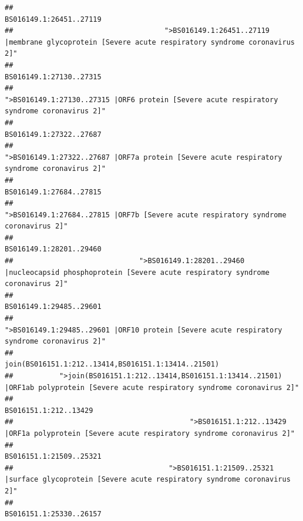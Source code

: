 \documentclass[
]{article}
\begin{document}
\begin{verbatim}
##                                                                                                                BS016149.1:26451..27119 
##                                    ">BS016149.1:26451..27119 |membrane glycoprotein [Severe acute respiratory syndrome coronavirus 2]" 
##                                                                                                                BS016149.1:27130..27315 
##                                             ">BS016149.1:27130..27315 |ORF6 protein [Severe acute respiratory syndrome coronavirus 2]" 
##                                                                                                                BS016149.1:27322..27687 
##                                            ">BS016149.1:27322..27687 |ORF7a protein [Severe acute respiratory syndrome coronavirus 2]" 
##                                                                                                                BS016149.1:27684..27815 
##                                                    ">BS016149.1:27684..27815 |ORF7b [Severe acute respiratory syndrome coronavirus 2]" 
##                                                                                                                BS016149.1:28201..29460 
##                              ">BS016149.1:28201..29460 |nucleocapsid phosphoprotein [Severe acute respiratory syndrome coronavirus 2]" 
##                                                                                                                BS016149.1:29485..29601 
##                                            ">BS016149.1:29485..29601 |ORF10 protein [Severe acute respiratory syndrome coronavirus 2]" 
##                                                                                    join(BS016151.1:212..13414,BS016151.1:13414..21501) 
##           ">join(BS016151.1:212..13414,BS016151.1:13414..21501) |ORF1ab polyprotein [Severe acute respiratory syndrome coronavirus 2]" 
##                                                                                                                  BS016151.1:212..13429 
##                                          ">BS016151.1:212..13429 |ORF1a polyprotein [Severe acute respiratory syndrome coronavirus 2]" 
##                                                                                                                BS016151.1:21509..25321 
##                                     ">BS016151.1:21509..25321 |surface glycoprotein [Severe acute respiratory syndrome coronavirus 2]" 
##                                                                                                                BS016151.1:25330..26157 

\end{verbatim}
\end{document}
